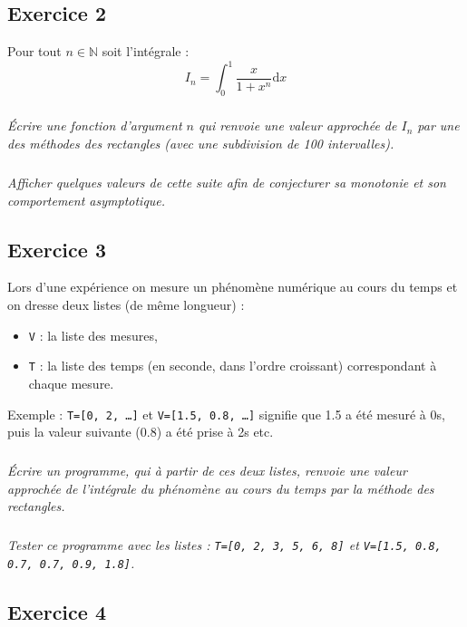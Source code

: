\documentclass[10pt,oneside]{article}
\begin{document}
\subsection*{Exercice 2}
\setcounter{subparagraph}{0} 
Pour tout $n\in\mathbb{N}$ soit l'intégrale : 
$$I_n=\int_0^1\frac{x}{1+x^n} \text{d}x$$

\subparagraph{}
\textit{Écrire une fonction d'argument $n$ qui renvoie une valeur approchée de $I_n$ par une des méthodes des rectangles (avec une subdivision de 100 intervalles).}

\subparagraph{}
\textit{Afficher quelques  valeurs de cette suite afin de conjecturer sa monotonie et son comportement asymptotique.}

\subsection*{Exercice 3}
\setcounter{subparagraph}{0}
Lors d'une expérience on mesure un phénomène numérique au cours du temps et on dresse deux listes (de même longueur) :
\begin{itemize}
\item \texttt{V} : la liste des mesures, 
\item \texttt{T} : la liste des temps (en seconde, dans l'ordre croissant) correspondant à chaque mesure.
\end{itemize}
Exemple : \texttt{T=[0, 2, \ldots]} et \texttt{V=[1.5, 0.8, \ldots]} signifie que 1.5 a été mesuré à 0s, puis la valeur suivante  (0.8) a été prise à 2s etc.

\subparagraph{}
\textit{Écrire un programme, qui à partir de ces deux listes, renvoie une valeur approchée de l'intégrale du phénomène au cours du temps par la méthode des rectangles.}

\subparagraph{}
\textit{Tester ce programme avec les listes : \texttt{T=[0, 2, 3, 5, 6, 8]} et \texttt{V=[1.5, 0.8, 0.7, 0.7, 0.9, 1.8]}.}


\subsection*{Exercice 4}
\setcounter{subparagraph}{0}


\begin{minipage}{4cm}
\end{minipage}
\end{document}
